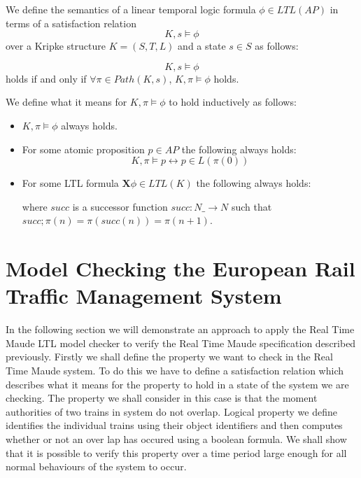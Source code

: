 \begin{mydef}
We define the semantics of a linear temporal logic formula $\phi \in LTL(AP)$ in terms of a satisfaction relation $$K,s \models \phi$$ over a Kripke structure $K = (S,T,L)$ and a state $s \in S$ as follows:

$$K,s \models \phi$$ holds if and only if $\forall \pi \in Path(K, s)$, $K,\pi \models \phi$ holds.

We define what it means for $K, \pi \models \phi$ to hold inductively as follows:

\begin{itemize} 
\item $K,\pi \models \phi$ always holds.

\item For some atomic proposition $p \in AP$ the following always holds:
     $$K,\pi \models p \leftrightarrow p \in L(\pi(0))$$

\item For some LTL formula $\mathbf{X} \phi \in LTL(K)$ the following always holds:
$$ $$

where $succ$ is a successor function $succ: N \_ \to N$ such that $succ;\pi(n) = \pi(succ(n)) = \pi(n + 1)$.

\end{itemize}

\end{mydef}





\section{Model Checking the European Rail Traffic Management System}
In the following section we will demonstrate an approach to apply the Real Time Maude LTL model checker to verify the Real Time Maude specification described previously.
Firstly we shall define the property we want to check in the Real Time Maude system. To do this we have to define a satisfaction relation which describes what it means for the property to hold in a state of the system we are checking.  The property we shall consider in this case is that the moment authorities of two trains in system do not overlap. Logical property we define identifies the individual trains using their object identifiers and then computes whether or not an over lap has occured using a boolean formula.  We shall show that it is possible to verify this property over a time period large enough for all normal behaviours of the system to occur. 

